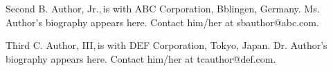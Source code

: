 \documentclass{IEEEcsmag}
\begin{document}
\begin{IEEEbiography}{Second B. Author, Jr.,}{\,}is with ABC Corporation, Bblingen, Germany. Ms. Author's biography appears here.  Contact him/her at sbauthor@abc.com.
\end{IEEEbiography}

\begin{IEEEbiography}{Third C. Author, III,}{\,}is with DEF Corporation, Tokyo, Japan. Dr. Author's biography appears here.  Contact him/her at tcauthor@def.com.
\end{IEEEbiography}
\end{document}
